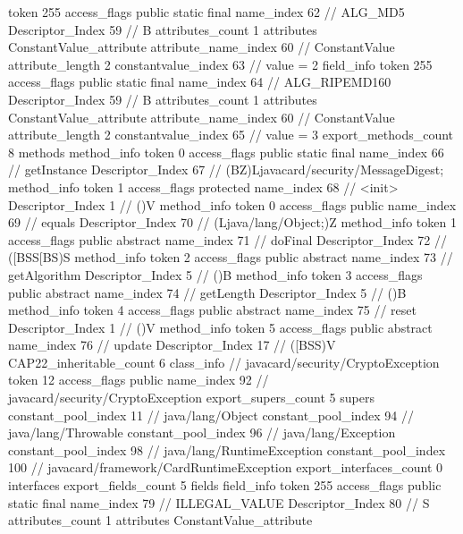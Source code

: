 {{{{{				token	255
				access_flags	public static final
				name_index	62		// ALG_MD5
				Descriptor_Index	59		// B
				attributes_count	1
				attributes {
				ConstantValue_attribute {
					attribute_name_index	60		// ConstantValue
					attribute_length	2
					constantvalue_index	63		// value = 2
				}
				}
			}
			field_info {
				token	255
				access_flags	public static final
				name_index	64		// ALG_RIPEMD160
				Descriptor_Index	59		// B
				attributes_count	1
				attributes {
				ConstantValue_attribute {
					attribute_name_index	60		// ConstantValue
					attribute_length	2
					constantvalue_index	65		// value = 3
				}
				}
			}
			}
			export_methods_count	8
			methods {
				method_info {
					token	0
					access_flags	public static final
					name_index	66		// getInstance
					Descriptor_Index	67		// (BZ)Ljavacard/security/MessageDigest;
				}
				method_info {
					token	1
					access_flags	protected
					name_index	68		// <init>
					Descriptor_Index	1		// ()V
				}
				method_info {
					token	0
					access_flags	public
					name_index	69		// equals
					Descriptor_Index	70		// (Ljava/lang/Object;)Z
				}
				method_info {
					token	1
					access_flags	public abstract
					name_index	71		// doFinal
					Descriptor_Index	72		// ([BSS[BS)S
				}
				method_info {
					token	2
					access_flags	public abstract
					name_index	73		// getAlgorithm
					Descriptor_Index	5		// ()B
				}
				method_info {
					token	3
					access_flags	public abstract
					name_index	74		// getLength
					Descriptor_Index	5		// ()B
				}
				method_info {
					token	4
					access_flags	public abstract
					name_index	75		// reset
					Descriptor_Index	1		// ()V
				}
				method_info {
					token	5
					access_flags	public abstract
					name_index	76		// update
					Descriptor_Index	17		// ([BSS)V
				}
			}
			CAP22_inheritable_count	6
		}
		class_info {		// javacard/security/CryptoException
			token	12
			access_flags	public
			name_index	92		// javacard/security/CryptoException
			export_supers_count	5
			supers {
				constant_pool_index	11		// java/lang/Object
				constant_pool_index	94		// java/lang/Throwable
				constant_pool_index	96		// java/lang/Exception
				constant_pool_index	98		// java/lang/RuntimeException
				constant_pool_index	100		// javacard/framework/CardRuntimeException
			}
			export_interfaces_count	0
			interfaces {
			}
			export_fields_count	5
			fields {
			field_info {
				token	255
				access_flags	public static final
				name_index	79		// ILLEGAL_VALUE
				Descriptor_Index	80		// S
				attributes_count	1
				attributes {
				ConstantValue_attribute {
}}}}}}}
